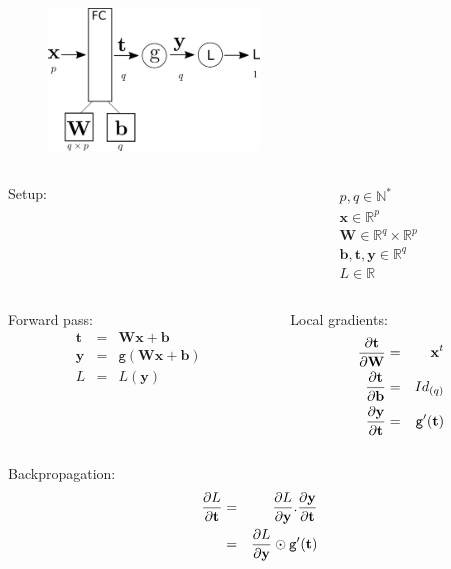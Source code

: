 \documentclass{book}
\newcommand{\x}{\mathbf{x}}
\newcommand{\y}{\mathbf{y}}
\newcommand{\W}{\mathbf{W}} %
\newcommand{\bias}{\mathbf{b}}%
\newcommand{\act}{\texttt{g}}%
\newcommand{\loss}{L}
\newcommand{\R}{\mathbb{R}}
\newcommand{\N}{\mathbb{N}}
\begin{document}
\begin{figure}[h]
    \centering
    \includegraphics[width=0.5\textwidth]{bp_fc.png}
\end{figure}

\begin{columns}
\begin{column}{.5\textwidth}
Setup:
\end{column}
\begin{column}{.5\textwidth}
\begin{eqnarray*}
p, q \in \N^*\\
\x \in \R^p \\
\W \in \R^q \times \R^p \\
\bias, \mathbf{t}, \y \in \R^q \\
\loss \in \R
\end{eqnarray*}
\end{column}
\end{columns}

\begin{columns}
\begin{column}{0.5\textwidth}
Forward pass:
\begin{eqnarray*}
\mathbf{t} &=& \W\x + \bias \\
\y &=& \act(\W\x + \bias) \\
\loss &=& \loss(\y)
\end{eqnarray*}
\end{column}
\begin{column}{0.5\textwidth}
Local gradients:
\begin{eqnarray*}
\pdv{\mathbf{t}}{\W} &=& \x^t \\
\pdv{\mathbf{t}}{\bias} &=& Id_{(q)} \\
\pdv{\y}{\mathbf{t}} &=& \act'(\mathbf{t})
\end{eqnarray*}
\end{column}
\end{columns}

Backpropagation:
\begin{eqnarray*}
\pdv{\loss}{\mathbf{t}} &=& \pdv{\loss}{\y}.\pdv{\y}{\mathbf{t}} \\
&=& \pdv{\loss}{\y} \odot \act'(\mathbf{t}) \\
\end{eqnarray*}
\end{document}
